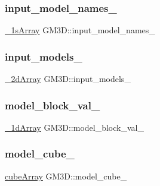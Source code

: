 \subsubsection{\texorpdfstring{input\_model\_names\_}{input\_model\_names\_}}
{\footnotesize\ttfamily \mbox{\hyperlink{head__func_8h_a6294167a90c8ef0fa3236f237dd0dcec}{\+\_\+1s\+Array}} G\+M3\+D\+::input\+\_\+model\+\_\+names\+\_\+\hspace{0.3cm}{\ttfamily [private]}}

\mbox{\label{class_g_m3_d_a52e40fcb10325d064e8a4722484092fe}} 
\subsubsection{\texorpdfstring{input\_models\_}{input\_models\_}}
{\footnotesize\ttfamily \mbox{\hyperlink{head__func_8h_aca123327d645334fb79bed52b3cda2b9}{\+\_\+2d\+Array}} G\+M3\+D\+::input\+\_\+models\+\_\+\hspace{0.3cm}{\ttfamily [private]}}

\mbox{\label{class_g_m3_d_a23a1f763de550b8548e73851f3a59482}} 
\subsubsection{\texorpdfstring{model\_block\_val\_}{model\_block\_val\_}}
{\footnotesize\ttfamily \mbox{\hyperlink{head__func_8h_ad98e111309150a71ccfa43e4adbbad21}{\+\_\+1d\+Array}} G\+M3\+D\+::model\+\_\+block\+\_\+val\+\_\+\hspace{0.3cm}{\ttfamily [private]}}

\mbox{\label{class_g_m3_d_af28fd86ad149f276a33e465a01edd4f3}} 
\subsubsection{\texorpdfstring{model\_cube\_}{model\_cube\_}}
{\footnotesize\ttfamily \mbox{\hyperlink{head__func_8h_a0b73a679a269c470465eb862fb43ab33}{cube\+Array}} G\+M3\+D\+::model\+\_\+cube\+\_\+\hspace{0.3cm}{\ttfamily [private]}}


